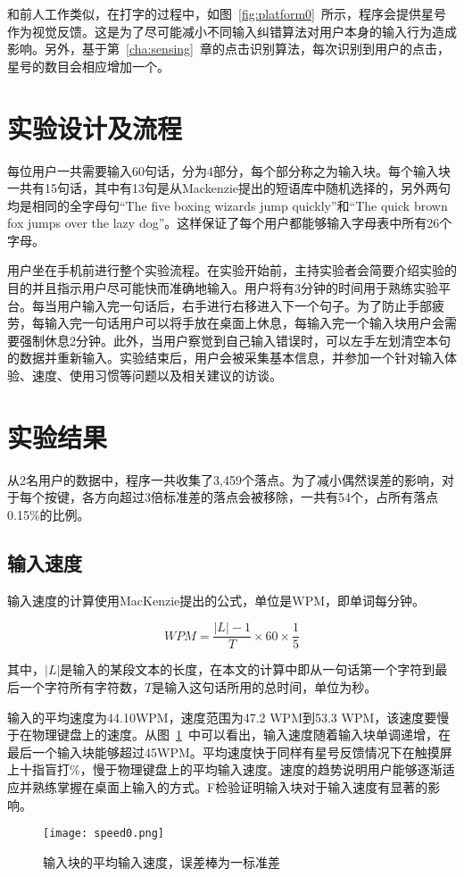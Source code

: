 和前人工作类似\cite{flatglass2011findlater}\cite{2017blindtype}，在打字的过程中，如图~\ref{fig:platform0}~所示，程序会提供星号作为视觉反馈。这是为了尽可能减小不同输入纠错算法对用户本身的输入行为造成影响。另外，基于第~\ref{cha:sensing}~章的点击识别算法，每次识别到用户的点击，星号的数目会相应增加一个。


\section{实验设计及流程}
每位用户一共需要输入60句话，分为4部分，每个部分称之为输入块。每个输入块一共有15句话，其中有13句是从Mackenzie提出的短语库\cite{mackenzie2003phrase}中随机选择的，另外两句均是相同的全字母句“The five boxing wizards jump quickly”和“The quick brown fox jumps over the lazy dog”。这样保证了每个用户都能够输入字母表中所有26个字母。

用户坐在手机前进行整个实验流程。在实验开始前，主持实验者会简要介绍实验的目的并且指示用户尽可能快而准确地输入。用户将有3分钟的时间用于熟练实验平台。每当用户输入完一句话后，右手进行右移进入下一个句子。为了防止手部疲劳，每输入完一句话用户可以将手放在桌面上休息，每输入完一个输入块用户会需要强制休息2分钟。此外，当用户察觉到自己输入错误时，可以左手左划清空本句的数据并重新输入。实验结束后，用户会被采集基本信息，并参加一个针对输入体验、速度、使用习惯等问题以及相关建议的访谈。

\section{实验结果}
从2名用户的数据中，程序一共收集了3,459个落点。为了减小偶然误差的影响，对于每个按键，各方向超过3倍标准差的落点会被移除，一共有54个，占所有落点0.15\%的比例。

\subsection{输入速度} %
输入速度的计算使用MacKenzie提出的公式\cite{speedcalc}，单位是WPM，即单词每分钟。

\begin{equation}
    \label{equ:calcspeed}
    WPM = \frac{|L|-1}{T} \times 60 \times \frac{1}{5}
\end{equation}

其中，$|L|$是输入的某段文本的长度，在本文的计算中即从一句话第一个字符到最后一个字符所有字符数，$T$是输入这句话所用的总时间，单位为秒。

输入的平均速度为44.10WPM，速度范围为47.2 WPM到53.3 WPM，该速度要慢于在物理键盘上的速度。从图~\ref{fig:speed0}~中可以看出，输入速度随着输入块单调递增，在最后一个输入块能够超过45WPM。平均速度快于同样有星号反馈情况下在触摸屏上十指盲打\%\cite{flatglass2011findlater}，慢于物理键盘上的平均输入速度。速度的趋势说明用户能够逐渐适应并熟练掌握在桌面上输入的方式。F检验证明输入块对于输入速度有显著的影响。
\begin{figure}[h] %
    \centering
    \texttt{[image: speed0.png]}
    \caption{输入块的平均输入速度，误差棒为一标准差}
    \label{fig:speed0}
\end{figure}

